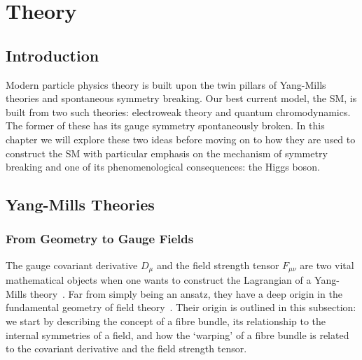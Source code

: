 \chapter{Theory}
\label{chap:theory}



\section{Introduction}
Modern particle physics theory is built upon the twin pillars of Yang-Mills theories and spontaneous symmetry breaking. 
Our best current model, the SM, is built from two such theories: electroweak theory and quantum chromodynamics. The former of these has its gauge symmetry spontaneously broken. 
In this chapter we will explore these two ideas before moving on to how they are used to construct the SM with particular emphasis on the mechanism of symmetry breaking and one of its phenomenological consequences: the Higgs boson. 

\section{Yang-Mills Theories}
\subsection{From Geometry to Gauge Fields}
The gauge covariant derivative $D_{\mu}$ and the field strength tensor $F_{\mu\nu}$ are two vital mathematical objects when one wants to construct the Lagrangian of a Yang-Mills theory~\cite{PeskinSchroeder}.
Far from simply being an ansatz, they have a deep origin in the fundamental geometry of field theory~\cite{penrose-roadtoreality-2005}. 
Their origin is outlined in this subsection: we start by describing the concept of a fibre bundle, its relationship to the internal symmetries of a field, and how the `warping' of a fibre bundle is related to the covariant derivative and the field strength tensor.

